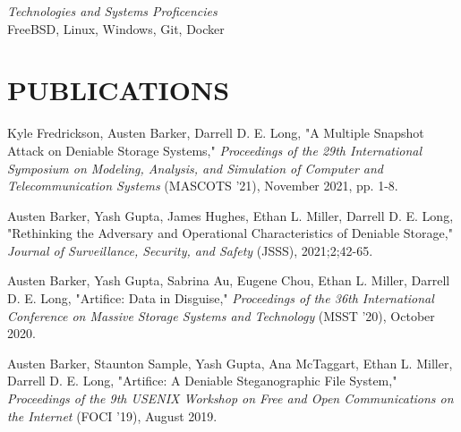 \documentclass[margin, 10pt]{res} %
\begin{document}
\begin{resume}
{\sl Technologies and Systems Proficencies}\\
FreeBSD, Linux, Windows, Git, Docker


\section{PUBLICATIONS}
\begin{etaremune}
\item Kyle Fredrickson, Austen Barker, Darrell D. E. Long, "A Multiple Snapshot Attack on Deniable Storage Systems," \emph{Proceedings of the 29th International Symposium on Modeling, Analysis, and Simulation of Computer and 
Telecommunication Systems} (MASCOTS '21), November 2021, pp. 1-8.
\item Austen Barker, Yash Gupta, James Hughes, Ethan L. Miller, Darrell D. E. Long, "Rethinking the Adversary and Operational Characteristics of Deniable Storage," \emph{Journal of Surveillance, Security, and Safety} (JSSS), 2021;2;42-65.
\item Austen Barker, Yash Gupta, Sabrina Au, Eugene Chou, Ethan L. Miller, Darrell D. E. Long, "Artifice: Data in Disguise," \emph{Proceedings of the 36th International Conference on Massive Storage Systems and Technology} (MSST '20), October 2020.
\item Austen Barker, Staunton Sample, Yash Gupta, Ana McTaggart, Ethan L. Miller, Darrell D. E. Long, "Artifice: A Deniable Steganographic File System," \emph{Proceedings of the 9th USENIX Workshop on Free and Open Communications on the Internet} (FOCI '19), August 2019.
\end{etaremune}
\end{resume}
\end{document}
